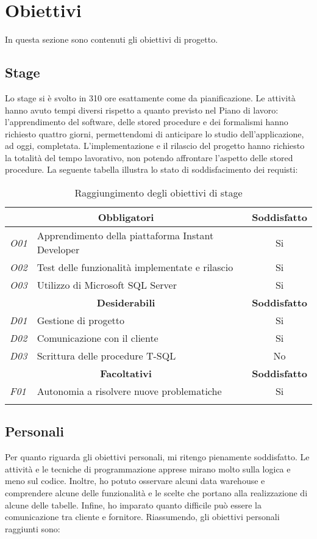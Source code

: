 \section{Obiettivi}
In questa sezione sono contenuti gli obiettivi di progetto.

\subsection{Stage}
Lo stage si è svolto in 310 ore esattamente come da pianificazione. Le attività hanno avuto tempi diversi rispetto a quanto previsto nel Piano di lavoro: l'apprendimento del software, delle stored procedure e dei formalismi hanno richiesto quattro giorni, permettendomi di anticipare lo studio dell'applicazione, ad oggi, completata.  L'implementazione e il rilascio del progetto hanno richiesto la totalità del tempo lavorativo, non potendo affrontare l'aspetto delle stored procedure. 
La seguente tabella illustra lo stato di soddisfacimento dei requisti:


	\begin{longtable}{ l|l|c }
		\hline
		
		\multicolumn{2}{c}{\textbf{Obbligatori}} & \textbf{Soddisfatto} \\
		\hline
		\textit{O01} & Apprendimento della piattaforma Instant Developer & Si\\
		\textit{O02} & Test delle funzionalità implementate e rilascio & Si\\
		\textit{O03} & Utilizzo di Microsoft SQL Server& Si\\
		\hline
		\multicolumn{2}{c}{\textbf{Desiderabili}} & \textbf{Soddisfatto}\\
		\hline
		\textit{D01} & Gestione di progetto & Si\\
		\textit{D02} & Comunicazione con il cliente & Si\\
		\textit{D03} & Scrittura delle procedure T-SQL& No\\
		\hline
		\multicolumn{2}{c}{\textbf{Facoltativi}} & \textbf{Soddisfatto}\\
		\hline
		\textit{F01} & Autonomia a risolvere nuove problematiche & Si\\
\caption{Raggiungimento degli obiettivi di stage}
		
	\end{longtable}
	

\subsection{Personali}
Per quanto riguarda gli obiettivi personali, mi ritengo pienamente soddisfatto. Le attività e le tecniche di programmazione apprese mirano molto sulla logica e meno sul codice. Inoltre, ho potuto osservare alcuni data warehouse e comprendere alcune delle funzionalità e le scelte che portano alla realizzazione di alcune delle tabelle. Infine, ho imparato quanto difficile può essere la comunicazione tra cliente e fornitore.
Riassumendo, gli obiettivi personali raggiunti sono:


